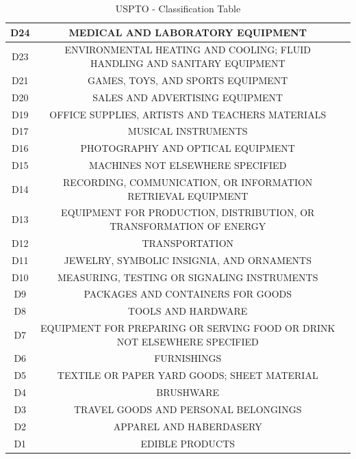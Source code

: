 \documentclass{sig-alternate}
\begin{document}
{\begin{table}
\begin{tabular}{|c|c|l|}
D24 & MEDICAL AND LABORATORY EQUIPMENT\\ \hline
D23 & ENVIRONMENTAL HEATING AND COOLING; FLUID HANDLING AND SANITARY EQUIPMENT\\ \hline
D21 & GAMES, TOYS, AND SPORTS EQUIPMENT\\ \hline
D20 & SALES AND ADVERTISING EQUIPMENT\\ \hline
D19 & OFFICE SUPPLIES, ARTISTS AND TEACHERS MATERIALS\\ \hline
D17 & MUSICAL INSTRUMENTS\\ \hline
D16 & PHOTOGRAPHY AND OPTICAL EQUIPMENT\\ \hline
D15 & MACHINES NOT ELSEWHERE SPECIFIED\\ \hline
D14 & RECORDING, COMMUNICATION, OR INFORMATION RETRIEVAL EQUIPMENT\\ \hline
D13 & EQUIPMENT FOR PRODUCTION, DISTRIBUTION, OR TRANSFORMATION OF ENERGY\\ \hline
D12 & TRANSPORTATION\\ \hline
D11 & JEWELRY, SYMBOLIC INSIGNIA, AND ORNAMENTS\\ \hline
D10 & MEASURING, TESTING OR SIGNALING INSTRUMENTS\\ \hline
D9 & PACKAGES AND CONTAINERS FOR GOODS\\ \hline
D8& TOOLS AND HARDWARE \\ \hline
D7& EQUIPMENT FOR PREPARING OR SERVING FOOD OR DRINK NOT ELSEWHERE SPECIFIED \\ \hline
D6 & FURNISHINGS\\ \hline
D5 & TEXTILE OR PAPER YARD GOODS; SHEET MATERIAL\\ \hline
D4 & BRUSHWARE\\ \hline
D3 & TRAVEL GOODS AND PERSONAL BELONGINGS\\ \hline
D2 & APPAREL AND HABERDASERY\\ \hline
D1 & EDIBLE PRODUCTS\\ \hline
\end{tabular}
\centering
\caption{USPTO - Classification Table}
\end{table} 
 
}
\end{document}
